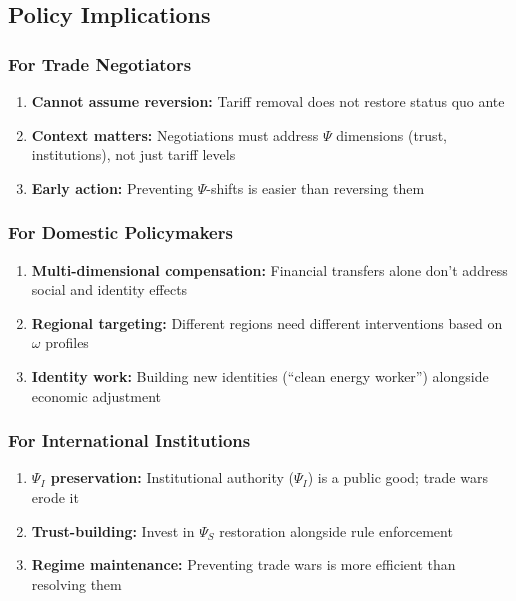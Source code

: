 \subsection{Policy Implications}

\subsubsection{For Trade Negotiators}

\begin{enumerate}
    \item \textbf{Cannot assume reversion:} Tariff removal does not restore status quo ante
    \item \textbf{Context matters:} Negotiations must address $\Psi$ dimensions (trust, institutions), not just tariff levels
    \item \textbf{Early action:} Preventing $\Psi$-shifts is easier than reversing them
\end{enumerate}

\subsubsection{For Domestic Policymakers}

\begin{enumerate}
    \item \textbf{Multi-dimensional compensation:} Financial transfers alone don't address social and identity effects
    \item \textbf{Regional targeting:} Different regions need different interventions based on $\omega$ profiles
    \item \textbf{Identity work:} Building new identities (``clean energy worker'') alongside economic adjustment
\end{enumerate}

\subsubsection{For International Institutions}

\begin{enumerate}
    \item \textbf{$\Psi_I$ preservation:} Institutional authority ($\Psi_I$) is a public good; trade wars erode it
    \item \textbf{Trust-building:} Invest in $\Psi_S$ restoration alongside rule enforcement
    \item \textbf{Regime maintenance:} Preventing trade wars is more efficient than resolving them
\end{enumerate}

